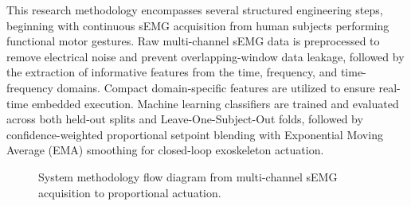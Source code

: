 \documentclass[12pt,a4paper]{article}
\begin{document}
This research methodology encompasses several structured engineering steps, beginning with continuous sEMG acquisition from human subjects performing functional motor gestures. Raw multi-channel sEMG data is preprocessed to remove electrical noise and prevent overlapping-window data leakage, followed by the extraction of informative features from the time, frequency, and time-frequency domains. Compact domain-specific features are utilized to ensure real-time embedded execution. Machine learning classifiers are trained and evaluated across both held-out splits and Leave-One-Subject-Out folds, followed by confidence-weighted proportional setpoint blending with Exponential Moving Average (EMA) smoothing for closed-loop exoskeleton actuation.

\begin{figure}[htbp]
\centering
{}
\caption{System methodology flow diagram from multi-channel sEMG acquisition to proportional actuation.}
\label{fig:methodology_flow}
\end{figure}
\end{document}

